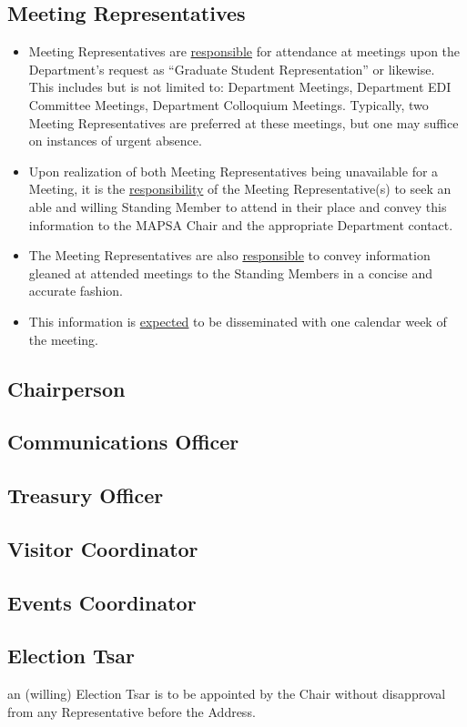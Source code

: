 \documentclass[11pt]{article}
\begin{document}
	\subsection{Meeting Representatives}
	\begin{itemize}
		\item Meeting Representatives are \underline{responsible} for attendance at meetings upon the Department's request as ``Graduate Student Representation'' or likewise.\\
		This includes but is not limited to: Department Meetings, Department EDI Committee Meetings, Department Colloquium Meetings. Typically, two Meeting Representatives are preferred at these meetings, but one may suffice on instances of urgent absence. 
		\item Upon realization of both Meeting Representatives being unavailable for a Meeting, it is the \underline{responsibility} of the Meeting Representative(s) to seek an able and willing Standing Member to attend in their place and convey this information to the MAPSA Chair and the appropriate Department contact.
		\item The Meeting Representatives are also \underline{responsible} to convey information gleaned at attended meetings to the Standing Members in a concise and accurate fashion. 
		\item This information is \underline{expected} to be disseminated with one calendar week of the meeting.
	\end{itemize} 
	\subsection{Chairperson}
	\subsection{Communications Officer}
	\subsection{Treasury Officer}
	\subsection{Visitor Coordinator}
	\subsection{Events Coordinator}
	\subsection{Election Tsar}
	an (willing) Election Tsar is to be appointed by the Chair without disapproval from any Representative before the Address.
	
\end{document}
